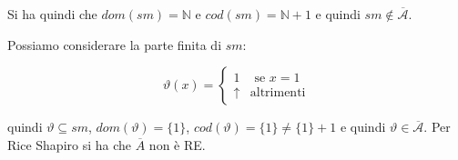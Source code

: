 Si ha quindi che $dom(sm) = \mathbb{N}$ e $cod(sm) = \mathbb{N} +1$ e quindi $sm \notin \overline{\mathcal{A}}$. 

Possiamo considerare la parte finita di $sm$:

$$
\vartheta(x) = \begin{cases}
	1 &\text{ se } x= 1\\
	\uparrow&\text{altrimenti}
\end{cases}
$$

quindi $\vartheta \subseteq sm$, $dom(\vartheta) = \{1\}$, $cod(\vartheta) = \{1\} \neq \{ 1\} +1$ e quindi $\vartheta \in \overline{\mathcal{A}}$. Per Rice Shapiro si ha che $\overline{A}$ non è RE.
